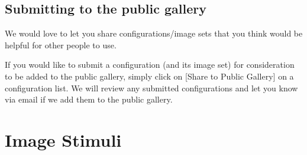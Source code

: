\documentclass{article}
\begin{document}
\subsection{Submitting to the public gallery}
\label{sec-submittingConfigurations}

We would love to let you share configurations/image sets that you
think would be helpful for other people to use.

If you would like to submit a configuration (and its image set) for
consideration to be added to the public gallery, simply click on [Share
to Public Gallery] on a configuration list.
We will review any submitted configurations and let you know via email
if we add them to the public gallery.


\section{Image Stimuli}
\label{sec-images}
\end{document}
